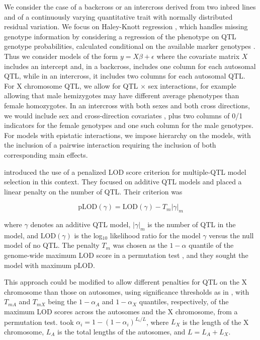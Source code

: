 \documentclass[12pt,letterpaper]{article}
\newcommand{\LOD}{\text{LOD}}
\newcommand{\pLOD}{\text{pLOD}}
\begin{document}
We consider the case of a backcross or an intercross derived from two
inbred lines and of a continuously varying quantitative trait with
normally distributed residual variation. We focus on Haley-Knott
regression \citep{Haley1992}, which handles missing genotype
information by considering a regression of the phenotype on QTL
genotype probabilities, calculated conditional on the available marker
genotypes \citep[see][]{Broman2009}. Thus we consider models of the
form $y = X\beta + \epsilon$ where the covariate matrix $X$ includes
an intercept and, in a backcross, includes one column for each autosomal
QTL, while in an intercross, it includes two columns for each autosomal
QTL. For X chromosome QTL, we allow for QTL $\times$ sex interactions,
for example allowing that male hemizygotes may have different average
phenotypes than female homozygotes. In an intercross with both sexes
and both cross directions, we would include sex and cross-direction
covariates \citep[see][]{Broman2006}, plus two columns of 0/1
indicators for the female genotypes and one such column for the male
genotypes. For models with epistatic interactions, we impose hierarchy
on the models, with the inclusion of a pairwise interaction requiring
the inclusion of both corresponding main effects.

\citet{Broman2002} introduced the use of a penalized LOD score
criterion for multiple-QTL model selection in this context. They
focused on additive QTL models and placed a linear penalty on the
number of QTL. Their criterion was

$$\pLOD(\gamma) = \LOD(\gamma) - T_m|\gamma|_m$$

\noindent
where $\gamma$ denotes an additive QTL model, $|\gamma|_m$ is the
number of QTL in the model, and $\LOD(\gamma)$ is the log$_{10}$
likelihood ratio for the model $\gamma$ versus the null model of no
QTL. The penalty $T_m$ was chosen as the $1-\alpha$ quantile of the
genome-wide maximum LOD score in a permutation test
\citep[see][]{Churchill1994}, and they sought the model with maximum
pLOD.

This approach could be modified to allow different penalties for QTL
on the X chromosome than those on autosomes, using significance
thresholds as in \citet{Broman2006}, with $T_{mA}$ and $T_{mX}$ being
the $1-\alpha_A$ and $1-\alpha_X$ quantiles, respectively, of the
maximum LOD scores across the autosomes and the X chromosome, from
a permutation test. \citet{Broman2006} took $\alpha_i = 1
- (1-\alpha_i)^{L_i/L}$, where $L_X$ is the length of the X
chromosome, $L_A$ is the total lengths of the autosomes, and $L = L_A
+ L_X$.
\end{document}
